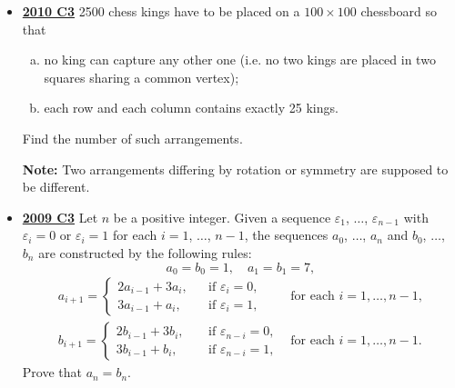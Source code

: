 \documentclass[11pt]{scrartcl}
\begin{document}
\begin{itemize}[leftmargin=*]
Show that we can choose a point $P$ in $\mathcal S$ and a line $\ell$ going through $P$ such that the resulting windmill uses each point of $\mathcal S$ as a pivot infinitely many times. 
\item \href{https://artofproblemsolving.com/community/c6h418687p2362298}{\textbf{2010 C3}} 2500 chess kings have to be placed on a $100 \times 100$ chessboard so that
\begin{enumerate}[(a)]
    \item no king can capture any other one (i.e. no two kings are placed in two squares sharing a common vertex);
    \item each row and each column contains exactly 25 kings.
\end{enumerate}
Find the number of such arrangements. 

\textbf{Note:} Two arrangements differing by rotation or symmetry are supposed to be different.
\newpage
\item \href{https://artofproblemsolving.com/community/c6h355915p1934456}{\textbf{2009 C3}} Let $n$ be a positive integer. Given a sequence $\varepsilon_1$, $\dots$, $\varepsilon_{n - 1}$ with $\varepsilon_i = 0$ or $\varepsilon_i = 1$ for each $i = 1$, $\dots$, $n - 1$, the sequences $a_0$, $\dots$, $a_n$ and $b_0$, $\dots$, $b_n$ are constructed by the following rules:\[a_0 = b_0 = 1, \quad a_1 = b_1 = 7,\]\[\begin{array}{lll}
	a_{i+1} = 
	\begin{cases}
		2a_{i-1} + 3a_i, \\
		3a_{i-1} + a_i, 
	\end{cases} & 
        \begin{array}{l} 
                \text{if } \varepsilon_i = 0, \\  
                \text{if } \varepsilon_i = 1, \end{array} 
         & \text{for each } i = 1, \dots, n - 1, \\[15pt]
        b_{i+1}= 
        \begin{cases}
		2b_{i-1} + 3b_i, \\
		3b_{i-1} + b_i, 
	\end{cases} & 
        \begin{array}{l} 
                \text{if } \varepsilon_{n-i} = 0, \\  
                \text{if } \varepsilon_{n-i} = 1, \end{array} 
         & \text{for each } i = 1, \dots, n - 1.
	\end{array}\]Prove that $a_n = b_n$. 

\end{itemize}
\end{document}
